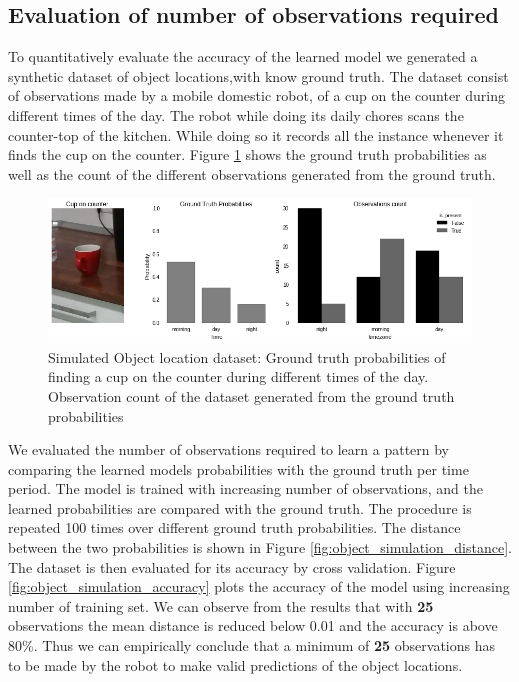 \subsection{Evaluation of number of observations required}

To quantitatively evaluate the accuracy of the learned model we generated a synthetic dataset of object locations,with know ground truth. The dataset consist of observations made by a mobile domestic robot, of a cup on the counter during different times of the day. The robot while doing its daily chores scans the counter-top of the kitchen. While doing so it records all the instance whenever it finds the cup on the counter. Figure \ref{simulation} shows the ground truth probabilities as well as the count of the different observations generated from the ground truth.

\begin{figure}[htp]
\centering
\includegraphics[width=\textwidth]{images/object_simulation.png}
\caption[Simulated object location dataset]{Simulated Object location dataset: Ground truth probabilities of finding a cup on the counter during different times of the day. Observation count of the dataset generated from the ground truth probabilities}
\label{simulation}
\end{figure}

We evaluated the number of observations required to learn a pattern by comparing the learned models  probabilities with the ground truth per time period. The model is trained with increasing number of observations, and the learned probabilities are compared with the ground truth. The procedure is repeated 100 times over different ground truth probabilities. The distance between the two probabilities is shown in Figure \ref{fig:object_simulation_distance}. The dataset is then evaluated for its accuracy by cross validation. Figure \ref {fig:object_simulation_accuracy} plots the accuracy of the model using increasing number of training set. We can observe from the results that with \textbf{25} observations the mean distance is reduced below 0.01 and the accuracy is above 80\%. Thus we can empirically conclude that a minimum of \textbf{25} observations has to be made by the robot to make valid predictions of the object locations. 

